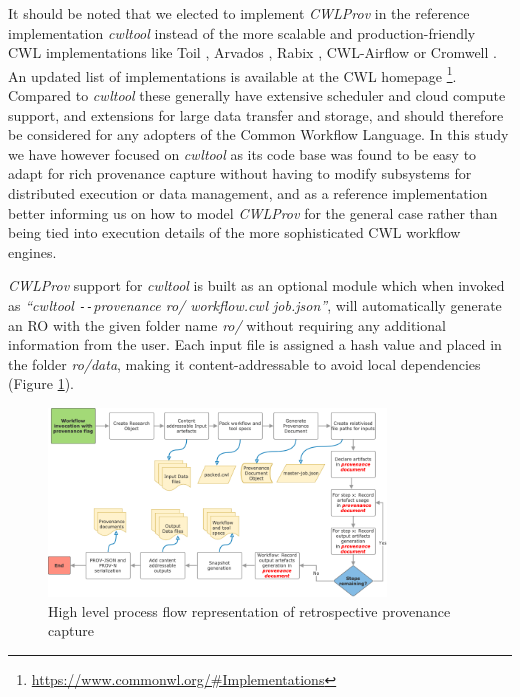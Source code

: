 \documentclass[a4paper,num-refs]{oup-contemporary}
\begin{document}
It should be noted that we elected to implement \textit{CWLProv} in the reference implementation \textit{cwltool} instead of the more scalable and production-friendly CWL implementations like Toil \citep{vivian2017toil}, Arvados \citep{arvados}, Rabix \citep{kaushik_2017}, CWL-Airflow \citep{cwlairflow2018} or Cromwell \citep{cromwell}. An updated list of implementations is available at the CWL homepage \footnote{\url{https://www.commonwl.org/\#Implementations}}. Compared to \textit{cwltool} these generally have extensive scheduler and cloud compute support, and extensions for large data transfer and storage, and should therefore be considered for any adopters of the Common Workflow Language. In this study we have however focused on \textit{cwltool} as its code base was found to be easy to adapt for rich provenance capture without having to modify subsystems for distributed execution or data management, and as a reference implementation better informing us on how to model \textit{CWLProv} for the general case rather than being tied into execution details of the more sophisticated CWL workflow engines.

\textit{CWLProv} support for \textit{cwltool} is built as an optional module which when invoked as \textit{``cwltool \texttt{-{}-}provenance ro/ workflow.cwl job.json''}, will automatically generate an RO with the given folder name \textit{ro/} without requiring any additional information from the user. Each input file is assigned a hash value and placed in the folder \textit{ro/data}, making it content-addressable to avoid local dependencies (Figure \ref{fig:processflow}).
\begin{figure} [t!]
    \includegraphics[width= 0.8\textwidth]{images/ProvenanceProcessFlow.png}
    \centering
    \captionsetup{justification=centering,margin=2cm}
\caption{High level process flow representation of retrospective provenance capture }\label{fig:processflow}
\end{figure} 
\end{document}
